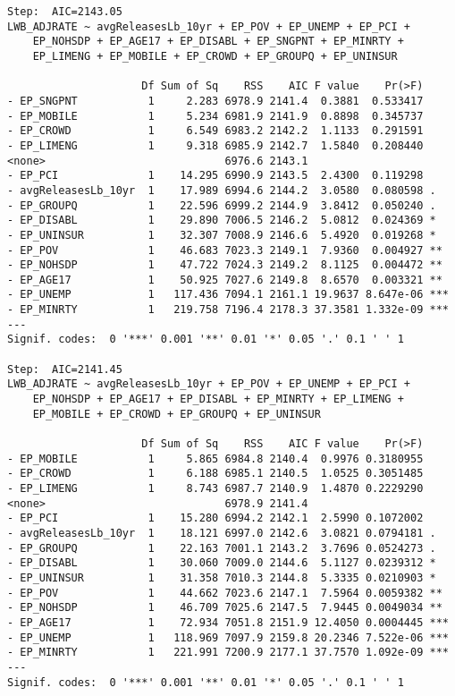 \documentclass[
  12pt,
]{article}
\begin{document}
\begin{verbatim}
Step:  AIC=2143.05
LWB_ADJRATE ~ avgReleasesLb_10yr + EP_POV + EP_UNEMP + EP_PCI + 
    EP_NOHSDP + EP_AGE17 + EP_DISABL + EP_SNGPNT + EP_MINRTY + 
    EP_LIMENG + EP_MOBILE + EP_CROWD + EP_GROUPQ + EP_UNINSUR

                     Df Sum of Sq    RSS    AIC F value    Pr(>F)    
- EP_SNGPNT           1     2.283 6978.9 2141.4  0.3881  0.533417    
- EP_MOBILE           1     5.234 6981.9 2141.9  0.8898  0.345737    
- EP_CROWD            1     6.549 6983.2 2142.2  1.1133  0.291591    
- EP_LIMENG           1     9.318 6985.9 2142.7  1.5840  0.208440    
<none>                            6976.6 2143.1                      
- EP_PCI              1    14.295 6990.9 2143.5  2.4300  0.119298    
- avgReleasesLb_10yr  1    17.989 6994.6 2144.2  3.0580  0.080598 .  
- EP_GROUPQ           1    22.596 6999.2 2144.9  3.8412  0.050240 .  
- EP_DISABL           1    29.890 7006.5 2146.2  5.0812  0.024369 *  
- EP_UNINSUR          1    32.307 7008.9 2146.6  5.4920  0.019268 *  
- EP_POV              1    46.683 7023.3 2149.1  7.9360  0.004927 ** 
- EP_NOHSDP           1    47.722 7024.3 2149.2  8.1125  0.004472 ** 
- EP_AGE17            1    50.925 7027.6 2149.8  8.6570  0.003321 ** 
- EP_UNEMP            1   117.436 7094.1 2161.1 19.9637 8.647e-06 ***
- EP_MINRTY           1   219.758 7196.4 2178.3 37.3581 1.332e-09 ***
---
Signif. codes:  0 '***' 0.001 '**' 0.01 '*' 0.05 '.' 0.1 ' ' 1

Step:  AIC=2141.45
LWB_ADJRATE ~ avgReleasesLb_10yr + EP_POV + EP_UNEMP + EP_PCI + 
    EP_NOHSDP + EP_AGE17 + EP_DISABL + EP_MINRTY + EP_LIMENG + 
    EP_MOBILE + EP_CROWD + EP_GROUPQ + EP_UNINSUR

                     Df Sum of Sq    RSS    AIC F value    Pr(>F)    
- EP_MOBILE           1     5.865 6984.8 2140.4  0.9976 0.3180955    
- EP_CROWD            1     6.188 6985.1 2140.5  1.0525 0.3051485    
- EP_LIMENG           1     8.743 6987.7 2140.9  1.4870 0.2229290    
<none>                            6978.9 2141.4                      
- EP_PCI              1    15.280 6994.2 2142.1  2.5990 0.1072002    
- avgReleasesLb_10yr  1    18.121 6997.0 2142.6  3.0821 0.0794181 .  
- EP_GROUPQ           1    22.163 7001.1 2143.2  3.7696 0.0524273 .  
- EP_DISABL           1    30.060 7009.0 2144.6  5.1127 0.0239312 *  
- EP_UNINSUR          1    31.358 7010.3 2144.8  5.3335 0.0210903 *  
- EP_POV              1    44.662 7023.6 2147.1  7.5964 0.0059382 ** 
- EP_NOHSDP           1    46.709 7025.6 2147.5  7.9445 0.0049034 ** 
- EP_AGE17            1    72.934 7051.8 2151.9 12.4050 0.0004445 ***
- EP_UNEMP            1   118.969 7097.9 2159.8 20.2346 7.522e-06 ***
- EP_MINRTY           1   221.991 7200.9 2177.1 37.7570 1.092e-09 ***
---
Signif. codes:  0 '***' 0.001 '**' 0.01 '*' 0.05 '.' 0.1 ' ' 1


\end{verbatim}
\end{document}
